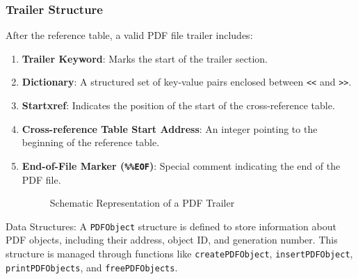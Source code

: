 \documentclass{article}
\begin{document}
\subsubsection*{Trailer Structure}

After the reference table, a valid PDF file trailer includes:

\begin{enumerate}
    \item \textbf{Trailer Keyword}: Marks the start of the trailer section.
    
    \item \textbf{Dictionary}: A structured set of key-value pairs enclosed between \texttt{<<} and \texttt{>>}.
    
    \item \textbf{Startxref}: Indicates the position of the start of the cross-reference table.
    
    \item \textbf{Cross-reference Table Start Address}: An integer pointing to the beginning of the reference table.
    
    \item \textbf{End-of-File Marker (\texttt{\%\%EOF})}: Special comment indicating the end of the PDF file.
    
    \begin{figure}[H]
        \centering
        \caption{Schematic Representation of a PDF Trailer}
        \label{fig:pdf_trailer}
    \end{figure}
    
\end{enumerate}
    
 Data Structures: A \texttt{PDFObject} structure is defined to store information about PDF objects, including their address, object ID, and generation number. This structure is managed through functions like \texttt{createPDFObject}, \texttt{insertPDFObject}, \texttt{printPDFObjects}, and \texttt{freePDFObjects}.
\end{document}
